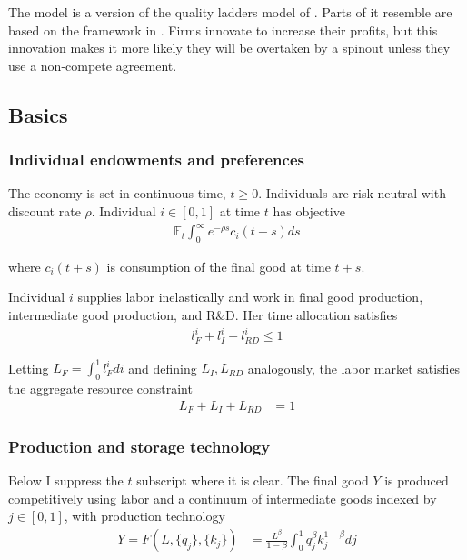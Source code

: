 \documentclass[12pt,english]{article}
\theoremstyle{remark}
\begin{document}
The model is a version of the quality ladders model of \cite{grossman_quality_1991}. Parts of it resemble are based on the framework in \cite{akcigit_growth_2018}. Firms innovate to increase their profits, but this innovation makes it more likely they will be overtaken by a spinout unless they use a non-compete agreement.

\subsection{Basics}

\subsubsection{Individual endowments and preferences}

The economy is set in continuous time, $t \ge 0$. Individuals are risk-neutral with discount rate $\rho$. Individual $i \in [0,1]$ at time $t$ has objective
\begin{align*}
\mathbb{E}_t \int_0^{\infty} e^{-\rho s} c_i(t+s) ds
\end{align*}

where $c_i(t+s)$ is consumption of the final good at time $t+s$.

Individual $i$ supplies labor inelastically and work in final good production, intermediate good production, and R\&D. Her time allocation satisfies
\begin{align*}
l_F^i + l_I^i + l_{RD}^i \le 1
\end{align*}

Letting $L_F = \int_0^1 l_F^i di$ and defining $L_I,L_{RD}$ analogously, the labor market satisfies the aggregate resource constraint
\begin{align}
L_F + L_I + L_{RD} &= 1 \label{labor_resource_constraint}
\end{align}

\subsubsection{Production and storage technology}

Below I suppress the $t$ subscript where it is clear. The final good $Y$ is produced competitively using labor and a continuum of intermediate goods indexed by $j \in [0,1]$, with production technology
\begin{align}
Y = F(L,\{q_j\},\{k_j\}) &= \frac{L^{\beta}}{1-\beta} \int_0^1 q_j^{\beta} k_j^{1-\beta} dj \label{final_goods_production}
\end{align}
\end{document}
